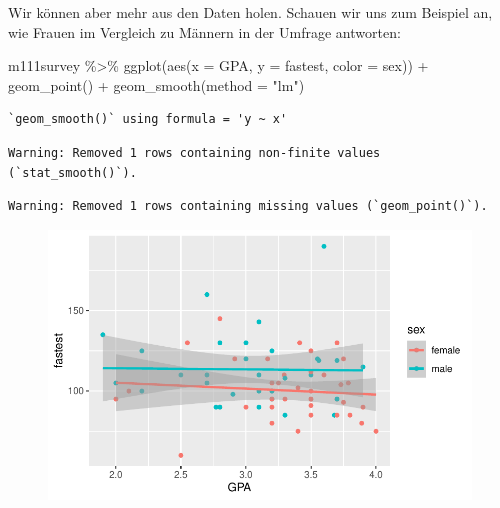 \documentclass[
  letterpaper,
  DIV=11,
  numbers=noendperiod]{scrartcl}
\newenvironment{Shaded}{\begin{snugshade}}{\end{snugshade}}
\newcommand{\AttributeTok}[1]{\textcolor[rgb]{0.40,0.45,0.13}{#1}}
\newcommand{\FunctionTok}[1]{\textcolor[rgb]{0.28,0.35,0.67}{#1}}
\newcommand{\NormalTok}[1]{\textcolor[rgb]{0.00,0.23,0.31}{#1}}
\newcommand{\SpecialCharTok}[1]{\textcolor[rgb]{0.37,0.37,0.37}{#1}}
\newcommand{\StringTok}[1]{\textcolor[rgb]{0.13,0.47,0.30}{#1}}
\begin{document}
Wir können aber mehr aus den Daten holen. Schauen wir uns zum Beispiel
an, wie Frauen im Vergleich zu Männern in der Umfrage antworten:

\begin{Shaded}
\begin{Highlighting}[]
\NormalTok{m111survey }\SpecialCharTok{\%\textgreater{}\%} 
  \FunctionTok{ggplot}\NormalTok{(}\FunctionTok{aes}\NormalTok{(}\AttributeTok{x =}\NormalTok{ GPA, }\AttributeTok{y =}\NormalTok{ fastest, }\AttributeTok{color =}\NormalTok{ sex)) }\SpecialCharTok{+}
  \FunctionTok{geom\_point}\NormalTok{() }\SpecialCharTok{+}
  \FunctionTok{geom\_smooth}\NormalTok{(}\AttributeTok{method =} \StringTok{"lm"}\NormalTok{)}
\end{Highlighting}
\end{Shaded}

\begin{verbatim}
`geom_smooth()` using formula = 'y ~ x'
\end{verbatim}

\begin{verbatim}
Warning: Removed 1 rows containing non-finite values (`stat_smooth()`).
\end{verbatim}

\begin{verbatim}
Warning: Removed 1 rows containing missing values (`geom_point()`).
\end{verbatim}

\begin{figure}[H]

{\centering \includegraphics{05-visualisierung_files/figure-pdf/unnamed-chunk-6-1.pdf}

}

\end{figure}
\end{document}
